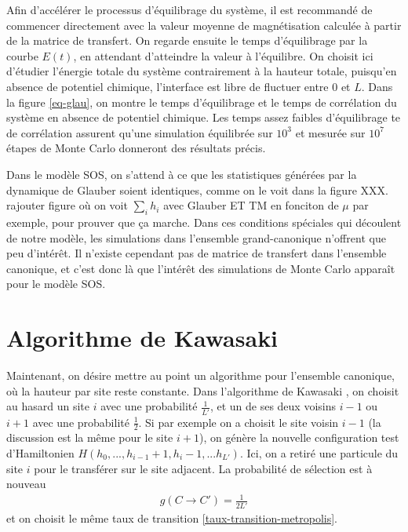 Afin d'accélérer le processus d'équilibrage du système, il est recommandé de commencer directement avec la valeur moyenne de magnétisation calculée à partir de la matrice de transfert. On regarde ensuite le temps d'équilibrage par la courbe $E(t)$, en attendant d'atteindre la valeur à l'équilibre. On choisit ici d'étudier l'énergie totale du système contrairement à la hauteur totale, puisqu'en absence de potentiel chimique, l'interface est libre de fluctuer entre $0$ et $L$. Dans la figure \ref{eq-glau}, on montre le temps d'équilibrage et le temps de corrélation du système en absence de potentiel chimique. Les temps assez faibles d'équilibrage te de corrélation assurent qu'une simulation équilibrée sur $10^3$ et mesurée sur $10^7$ étapes de Monte Carlo donneront des résultats précis.

Dans le modèle SOS, on s'attend à ce que les statistiques générées par la dynamique de Glauber soient identiques, comme on le voit dans la figure XXX.
{\color{red} rajouter figure où on voit $\sum_i h_i$ avec Glauber ET TM en fonciton de $\mu$ par exemple, pour prouver que ça marche.}
Dans ces conditions spéciales qui découlent de notre modèle, les simulations dans l'ensemble grand-canonique n'offrent que peu d'intérêt. Il n'existe cependant pas de matrice de transfert dans l'ensemble canonique, et c'est donc là que l'intérêt des simulations de Monte Carlo apparaît pour le modèle SOS.

    \section{Algorithme de Kawasaki}

Maintenant, on désire mettre au point un algorithme pour l'ensemble canonique, où la hauteur par site reste constante. Dans l'algorithme de Kawasaki \cite{kawasaki_diffusion_1966}, on choisit au hasard un site $i$ avec une probabilité $\frac{1}{L'}$, et un de ses deux voisins $i-1$ ou $i+1$ avec une probabilité $\frac{1}{2}$. Si par exemple on a choisit le site voisin $i-1$ (la discussion est la même pour le site $i+1$), on génère  la nouvelle configuration test d'Hamiltonien $H(h_0,...,h_{i-1}+1,h_i-1,...h_{L'})$. Ici, on a retiré une particule du site $i$ pour le transférer sur le site adjacent. 
La probabilité de sélection est à nouveau
\begin{align}
    g(C\to C') = \frac{1}{2L'}
\end{align}
et on choisit le même taux de transition  \ref{taux-transition-metropolis}.

